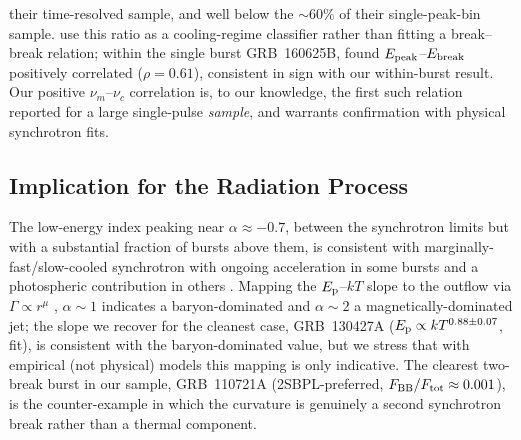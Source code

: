 \documentclass[twocolumn]{aastex631}
\newcommand{\nuc}{\ensuremath{\nu_c}}
\newcommand{\num}{\ensuremath{\nu_m}}
\newcommand{\Ep}{\ensuremath{E_{\rm p}}}
\newcommand{\kT}{\ensuremath{kT}}
\begin{document}
their time-resolved sample, and well below the $\sim$$60\%$ of their
single-peak-bin sample. \citet{Mei2025} use this ratio as a cooling-regime
classifier rather than fitting a break--break relation; within the single burst GRB~160625B,
\citet{Ravasio2018} found $E_{\rm peak}$--$E_{\rm break}$ positively correlated
($\rho=0.61$), consistent in sign with our within-burst result. Our positive
$\num$--$\nuc$ correlation is, to our knowledge, the first such relation
reported for a large single-pulse \emph{sample}, and warrants confirmation
with physical synchrotron fits.

\subsection{Implication for the Radiation Process} \label{sec:disc-radiation}
The low-energy index peaking near $\alpha\approx-0.7$, between the
synchrotron limits but with a substantial fraction of bursts above them, is
consistent with marginally-fast/slow-cooled synchrotron with ongoing
acceleration in some bursts and a photospheric contribution in others
\citep[cf.][]{Basak2014,Burgess2014b}. Mapping the $\Ep$--$\kT$ slope to the
outflow via $\Gamma\propto r^{\mu}$ \citep{Burgess2014a}, $\alpha\!\sim\!1$
indicates a baryon-dominated and $\alpha\!\sim\!2$ a magnetically-dominated
jet; the slope we recover for the cleanest case, GRB~130427A
($\Ep\propto\kT^{0.88\pm0.07}$, \citealt{DAgostini2005} fit), is consistent
with the baryon-dominated value, but we stress that with empirical (not
physical) models this mapping is only indicative. The clearest two-break burst
in our sample, GRB~110721A (2SBPL-preferred, $F_{\rm BB}/F_{\rm
tot}\approx0.001$), is the counter-example in which the curvature is genuinely
a second synchrotron break rather than a thermal component.

\end{document}
